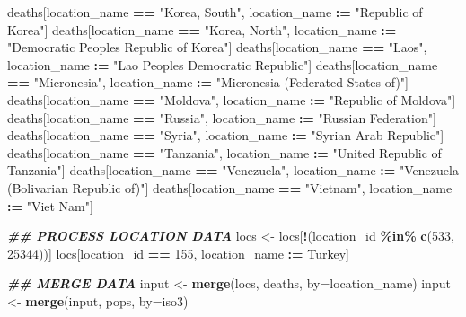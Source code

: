 \documentclass[
]{article}
\newenvironment{Shaded}{\begin{snugshade}}{\end{snugshade}}
\newcommand{\AttributeTok}[1]{\textcolor[rgb]{0.13,0.29,0.53}{#1}}
\newcommand{\DecValTok}[1]{\textcolor[rgb]{0.00,0.00,0.81}{#1}}
\newcommand{\DocumentationTok}[1]{\textcolor[rgb]{0.56,0.35,0.01}{\textbf{\textit{#1}}}}
\newcommand{\FunctionTok}[1]{\textcolor[rgb]{0.13,0.29,0.53}{\textbf{#1}}}
\newcommand{\NormalTok}[1]{#1}
\newcommand{\OtherTok}[1]{\textcolor[rgb]{0.56,0.35,0.01}{#1}}
\newcommand{\SpecialCharTok}[1]{\textcolor[rgb]{0.81,0.36,0.00}{\textbf{#1}}}
\newcommand{\StringTok}[1]{\textcolor[rgb]{0.31,0.60,0.02}{#1}}
\begin{document}
\begin{Shaded}
\begin{Highlighting}[]
\NormalTok{deaths[location\_name }\SpecialCharTok{==} \StringTok{"Korea, South"}\NormalTok{, location\_name }\SpecialCharTok{:=} \StringTok{"Republic of Korea"}\NormalTok{]}
\NormalTok{deaths[location\_name }\SpecialCharTok{==} \StringTok{"Korea, North"}\NormalTok{, location\_name }\SpecialCharTok{:=} \StringTok{"Democratic People\textquotesingle{}s Republic of Korea"}\NormalTok{]}
\NormalTok{deaths[location\_name }\SpecialCharTok{==} \StringTok{"Laos"}\NormalTok{, location\_name }\SpecialCharTok{:=} \StringTok{"Lao People\textquotesingle{}s Democratic Republic"}\NormalTok{]}
\NormalTok{deaths[location\_name }\SpecialCharTok{==} \StringTok{"Micronesia"}\NormalTok{, location\_name }\SpecialCharTok{:=} \StringTok{"Micronesia (Federated States of)"}\NormalTok{]}
\NormalTok{deaths[location\_name }\SpecialCharTok{==} \StringTok{"Moldova"}\NormalTok{, location\_name }\SpecialCharTok{:=} \StringTok{"Republic of Moldova"}\NormalTok{]}
\NormalTok{deaths[location\_name }\SpecialCharTok{==} \StringTok{"Russia"}\NormalTok{, location\_name }\SpecialCharTok{:=} \StringTok{"Russian Federation"}\NormalTok{]}
\NormalTok{deaths[location\_name }\SpecialCharTok{==} \StringTok{"Syria"}\NormalTok{, location\_name }\SpecialCharTok{:=} \StringTok{"Syrian Arab Republic"}\NormalTok{]}
\NormalTok{deaths[location\_name }\SpecialCharTok{==} \StringTok{"Tanzania"}\NormalTok{, location\_name }\SpecialCharTok{:=} \StringTok{"United Republic of Tanzania"}\NormalTok{]}
\NormalTok{deaths[location\_name }\SpecialCharTok{==} \StringTok{"Venezuela"}\NormalTok{, location\_name }\SpecialCharTok{:=} \StringTok{"Venezuela (Bolivarian Republic of)"}\NormalTok{]}
\NormalTok{deaths[location\_name }\SpecialCharTok{==} \StringTok{"Vietnam"}\NormalTok{, location\_name }\SpecialCharTok{:=} \StringTok{"Viet Nam"}\NormalTok{]}

\DocumentationTok{\#\# PROCESS LOCATION DATA}
\NormalTok{locs }\OtherTok{\textless{}{-}}\NormalTok{ locs[}\SpecialCharTok{!}\NormalTok{(location\_id }\SpecialCharTok{\%in\%} \FunctionTok{c}\NormalTok{(}\DecValTok{533}\NormalTok{, }\DecValTok{25344}\NormalTok{))]}
\NormalTok{locs[location\_id }\SpecialCharTok{==} \DecValTok{155}\NormalTok{, location\_name }\SpecialCharTok{:=} \StringTok{\textquotesingle{}Turkey\textquotesingle{}}\NormalTok{]}

\DocumentationTok{\#\# MERGE DATA}
\NormalTok{input }\OtherTok{\textless{}{-}} \FunctionTok{merge}\NormalTok{(locs, deaths, }\AttributeTok{by=}\StringTok{\textquotesingle{}location\_name\textquotesingle{}}\NormalTok{)}
\NormalTok{input }\OtherTok{\textless{}{-}} \FunctionTok{merge}\NormalTok{(input, pops, }\AttributeTok{by=}\StringTok{\textquotesingle{}iso3\textquotesingle{}}\NormalTok{)}


\end{Highlighting}
\end{Shaded}
\end{document}
